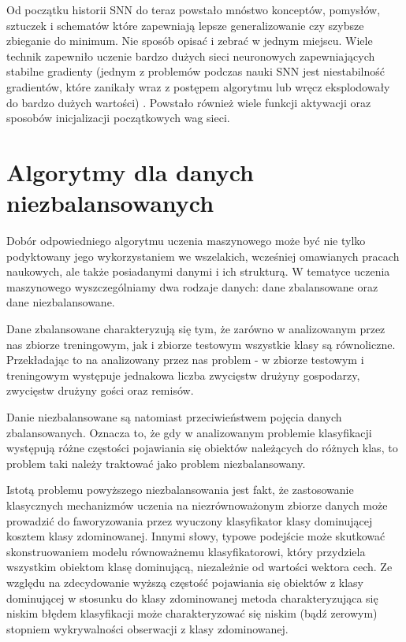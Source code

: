 Od początku historii SNN do teraz powstało mnóstwo konceptów, pomysłów, sztuczek i schematów które zapewniają lepsze generalizowanie czy szybsze zbieganie do minimum. Nie sposób  opisać i zebrać w jednym miejscu. Wiele technik zapewniło uczenie bardzo dużych sieci neuronowych zapewniających stabilne gradienty (jednym z problemów podczas nauki SNN jest niestabilność gradientów, które zanikały wraz z postępem algorytmu lub wręcz eksplodowały do bardzo dużych wartości) \cite{gradient}. Powstało również wiele funkcji aktywacji oraz sposobów inicjalizacji początkowych wag sieci.

\section{Algorytmy dla danych niezbalansowanych}
\noindent
\label{ImbalancedData}

\noindent Dobór odpowiedniego algorytmu uczenia maszynowego może być nie tylko podyktowany jego wykorzystaniem we wszelakich, wcześniej omawianych pracach naukowych, ale także posiadanymi danymi i ich strukturą. W tematyce uczenia maszynowego wyszczególniamy dwa rodzaje danych: dane zbalansowane oraz dane niezbalansowane.

Dane zbalansowane charakteryzują się tym, że zarówno w analizowanym przez nas zbiorze treningowym, jak i zbiorze testowym wszystkie klasy są równoliczne. Przekładając to na analizowany przez nas problem - w zbiorze testowym i treningowym występuje jednakowa liczba zwycięstw drużyny gospodarzy, zwycięstw drużyny gości oraz remisów.

Danie niezbalansowane są natomiast przeciwieństwem pojęcia danych zbalansowanych. Oznacza to, że gdy w analizowanym problemie klasyfikacji występują różne częstości pojawiania się obiektów należących do różnych klas, to problem taki należy traktować jako problem niezbalansowany.

Istotą problemu powyższego niezbalansowania jest fakt, że zastosowanie klasycznych mechanizmów uczenia na niezrównoważonym zbiorze danych może prowadzić do faworyzowania przez wyuczony klasyfikator klasy dominującej kosztem klasy zdominowanej. Innymi słowy, typowe podejście może skutkować skonstruowaniem modelu równoważnemu klasyfikatorowi, który przydziela wszystkim obiektom klasę dominującą, niezależnie od wartości wektora cech. Ze względu na zdecydowanie wyższą częstość pojawiania się obiektów z klasy dominującej w stosunku do klasy zdominowanej metoda charakteryzująca się niskim błędem klasyfikacji może charakteryzować się niskim (bądź zerowym) stopniem wykrywalności obserwacji z klasy zdominowanej. \cite{MZieba}

